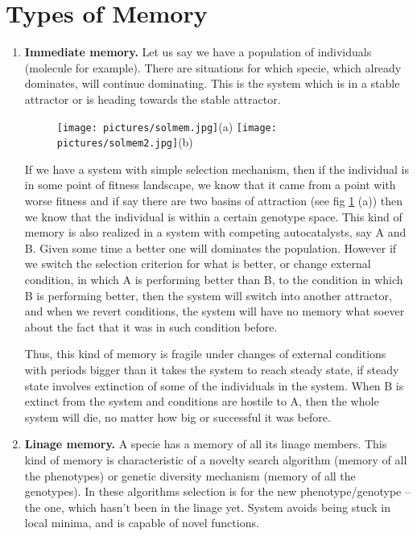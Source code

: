 \documentclass[12pt]{paper}
\begin{document}
\section{Types of Memory}
\begin{enumerate}
 \item \textbf{Immediate memory.} Let us say we have a population of individuals (molecule for 
example). There are situations for which specie, which already dominates, will continue dominating. 
This is the system which is in a stable attractor or is heading towards the stable attractor. 
\begin{figure}[htb!]
  \centering
  \texttt{[image: pictures/solmem.jpg]}(a)
  \texttt{[image: pictures/solmem2.jpg]}(b)
  \caption{}
  \label{fig:solmem}
\end{figure}
 If we have a system with simple selection mechanism, then if the individual is in some point of 
fitness landscape, we know that it came from a point with worse fitness and if say there are two 
basins of attraction (see fig \ref{fig:solmem} (a)) then we know that the individual is within a 
certain genotype space. This kind of memory is also realized in a system with competing 
autocatalysts, say A and B. Given some time a better one will dominates the population. However if 
we switch the selection criterion for what is better, or change external condition, in which A is 
performing better than B, to the condition in which B is performing better, then the system will 
switch into another attractor, and when we revert conditions, the system will have no memory what 
soever about the fact that it was in such condition before. 

Thus, this kind of memory is fragile under changes of external conditions with periods bigger 
than it takes the system to reach steady state, if steady state involves extinction of some of the 
individuals in the system. When B is extinct from the system and conditions are hostile to A, then 
the whole system will die, no matter how big or successful it was before.
 
 
 \item \textbf{Linage memory.} A specie has a memory of all its linage members. This kind of memory 
is characteristic of a novelty search algorithm (memory of all the phenotypes) or genetic diversity 
mechanism (memory of all the genotypes). In these algorithms selection is for the new 
phenotype/genotype -- the one, which hasn't been in the linage yet. System avoids being stuck in 
local minima, and is capable of novel functions.


\end{enumerate}
\end{document}
